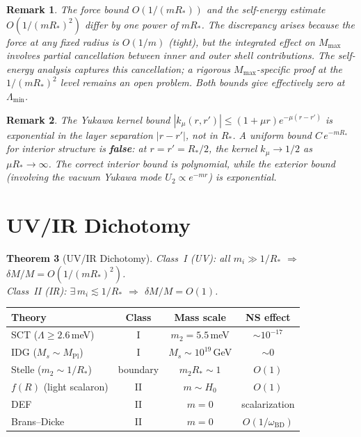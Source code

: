 \documentclass[12pt,a4paper]{article}
\newtheorem{theorem}{Theorem}[section]
\newtheorem{remark}[theorem]{Remark}
\newcommand{\Lam}{\Lambda}
\newcommand{\Mmax}{M_{\mathrm{max}}}
\newcommand{\Rstar}{R_*}
\begin{document}
\begin{remark}
The force bound $O(1/(m\Rstar))$ and the self-energy estimate $O(1/(m\Rstar)^2)$
differ by one power of $m\Rstar$.  The discrepancy arises because the force at
any fixed radius is $O(1/m)$ (tight), but the \emph{integrated} effect on $\Mmax$
involves partial cancellation between inner and outer shell contributions.
The self-energy analysis captures this cancellation; a rigorous $\Mmax$-specific
proof at the $1/(m\Rstar)^2$ level remains an open problem.
Both bounds give effectively zero at $\Lambda_{\min}$.
\end{remark}

\begin{remark}
The Yukawa kernel bound $|k_\mu(r,r')| \leq (1+\mu r)e^{-\mu(r-r')}$
is exponential in the \emph{layer separation} $|r-r'|$, not in $\Rstar$.
A uniform bound $C\,e^{-m\Rstar}$ for interior structure is \textbf{false}:
at $r = r' = \Rstar/2$, the kernel $k_\mu \to 1/2$ as $\mu\Rstar \to \infty$.
The correct interior bound is polynomial, while the exterior bound
(involving the vacuum Yukawa mode $U_2 \propto e^{-mr}$) is exponential.
\end{remark}

\section{UV/IR Dichotomy}
\label{sec:dichotomy}

\begin{theorem}[UV/IR Dichotomy]
\label{thm:dichotomy}
Class~I (UV): all $m_i \gg 1/\Rstar$ $\Rightarrow$ $\delta M/M = O(1/(m\Rstar)^2)$.\\
Class~II (IR): $\exists\,m_i \lesssim 1/\Rstar$ $\Rightarrow$ $\delta M/M = O(1)$.
\end{theorem}

\begin{center}
\begin{tabular}{lccc}
\toprule
\textbf{Theory} & \textbf{Class} & \textbf{Mass scale} & \textbf{NS effect} \\
\midrule
SCT ($\Lam \geq 2.6$\,meV) & I & $m_2 = 5.5$\,meV & $\sim 10^{-17}$ \\
IDG ($M_s \sim M_{\mathrm{Pl}}$) & I & $M_s \sim 10^{19}$\,GeV & $\sim 0$ \\
Stelle ($m_2 \sim 1/\Rstar$) & boundary & $m_2\Rstar \sim 1$ & $O(1)$ \\
$f(R)$ (light scalaron) & II & $m \sim H_0$ & $O(1)$ \\
DEF & II & $m = 0$ & scalarization \\
Brans--Dicke & II & $m = 0$ & $O(1/\omega_{\mathrm{BD}})$ \\
\bottomrule
\end{tabular}
\end{center}
\end{document}
